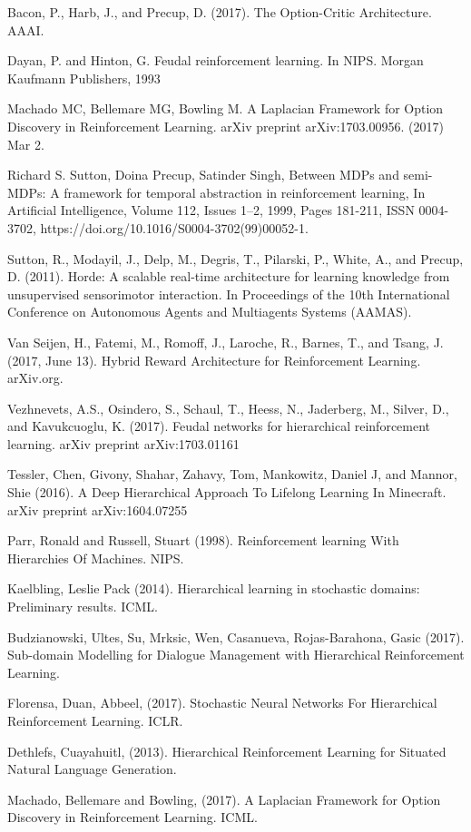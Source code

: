 \begin{thebibliography}{1}

\bibitem{} Bacon, P., Harb, J., and Precup, D. (2017). The Option-Critic Architecture. AAAI.

\bibitem{} Dayan, P. and Hinton, G. Feudal reinforcement learning. In NIPS. Morgan Kaufmann Publishers, 1993

\bibitem{} Machado MC, Bellemare MG, Bowling M. A Laplacian Framework for Option Discovery in Reinforcement Learning. arXiv preprint arXiv:1703.00956. (2017) Mar 2.

\bibitem{} Richard S. Sutton, Doina Precup, Satinder Singh, Between MDPs and semi-MDPs: A framework for temporal abstraction in reinforcement learning, In Artificial Intelligence, Volume 112, Issues 1–2, 1999, Pages 181-211, ISSN 0004-3702, https://doi.org/10.1016/S0004-3702(99)00052-1.

\bibitem{} Sutton, R., Modayil, J., Delp, M., Degris, T., Pilarski, P., White, A., and Precup, D. (2011). Horde: A scalable real-time architecture for learning knowledge from unsupervised sensorimotor interaction. In Proceedings of the 10th International Conference on Autonomous
Agents and Multiagents Systems (AAMAS).

\bibitem{} Van Seijen, H., Fatemi, M., Romoff, J., Laroche, R., Barnes, T., and Tsang, J. (2017, June 13). Hybrid Reward Architecture for Reinforcement Learning. arXiv.org.

\bibitem{} Vezhnevets, A.S., Osindero, S., Schaul, T., Heess, N., Jaderberg, M., Silver, D., and Kavukcuoglu, K. (2017). Feudal networks for hierarchical reinforcement learning. arXiv preprint arXiv:1703.01161

\bibitem{} Tessler, Chen, Givony, Shahar, Zahavy, Tom, Mankowitz, Daniel J, and Mannor, Shie (2016). A Deep Hierarchical Approach To Lifelong Learning In Minecraft. arXiv preprint arXiv:1604.07255

\bibitem{} Parr, Ronald and Russell, Stuart (1998). Reinforcement learning With Hierarchies Of Machines. NIPS.

\bibitem{} Kaelbling, Leslie Pack (2014). Hierarchical learning in stochastic domains: Preliminary results. ICML.

\bibitem{} Budzianowski, Ultes, Su, Mrksic, Wen, Casanueva, Rojas-Barahona, Gasic (2017). Sub-domain Modelling for Dialogue Management with Hierarchical Reinforcement Learning.

\bibitem{} Florensa, Duan, Abbeel, (2017). Stochastic Neural Networks For Hierarchical Reinforcement Learning. ICLR.

\bibitem{} Dethlefs, Cuayahuitl, (2013). Hierarchical Reinforcement Learning for Situated Natural Language Generation.

\bibitem{} Machado, Bellemare and Bowling, (2017). A Laplacian Framework for Option Discovery in Reinforcement Learning. ICML.

\end{thebibliography}

